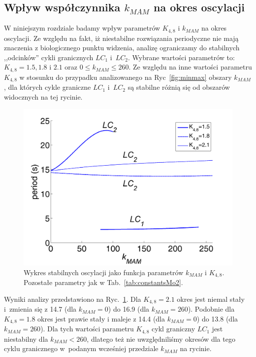 \FloatBarrier
\subsection{Wpływ współczynnika $k_{MAM}$ na okres oscylacji}
\label{ss:MAMoscMo2}

W niniejszym rozdziale badamy wpływ parametrów  $K_{4,8}$ i $k_{MAM}$ na okres oscylacji. Ze względu na fakt, iż niestabilne rozwiązania periodyczne nie mają znaczenia z biologicznego punktu widzenia, analizę ograniczamy do stabilnych ,,odcinków'' cykli granicznych $LC_1$ i~$LC_2$. Wybrane wartości parametrów to: $K_{4,8}= 1.5, 1.8 \textrm{ i } 2.1$ oraz $0 \leq k_{MAM} \leq 260$. Ze względu na inne wartości parametru $K_{4,8}$  w stosunku do przypadku analizowanego na Ryc~\ref{fig:minmax} obszary $k_{MAM}$, dla których cykle graniczne $LC_1$ i~$LC_2$ są stabilne różnią się od obszarów widocznych na tej rycinie.


\begin{figure}[ht]
    \centering
    \includegraphics[width=1\textwidth]{rysunki/rozdzial_5/periodlc.png}
    \caption[Stabilne oscylacje jako funkcja parametrów $k_{MAM}$ i $K_{4,8}$]{Wykres stabilnych oscylacji jako funkcja parametrów $k_{MAM}$ i $K_{4,8}$. Pozostałe parametry jak w Tab.~\ref{tab:constantsMo2}.}
    \label{fig:freq2kmam}
\end{figure}


Wyniki analizy przedstawiono na Ryc.~\ref{fig:freq2kmam}. Dla $K_{4,8}=2.1$ okres jest niemal stały i~zmienia się z 14.7 (dla $k_{MAM}=0$) do 16.9 (dla $k_{MAM}=260$). Podobnie dla $K_{4,8}=1.8$ okres jest prawie stały i maleje z 14.4 (dla $k_{MAM}=0$) do 13.8 (dla $k_{MAM}=260$). Dla tych wartości parametru $K_{4,8}$ cykl graniczny $LC_1$ jest niestabilny dla  $k_{MAM} < 260$, dlatego też nie uwzględniliśmy okresów dla tego cyklu granicznego w~podanym wcześniej przedziale $k_{MAM}$ na rycinie.

